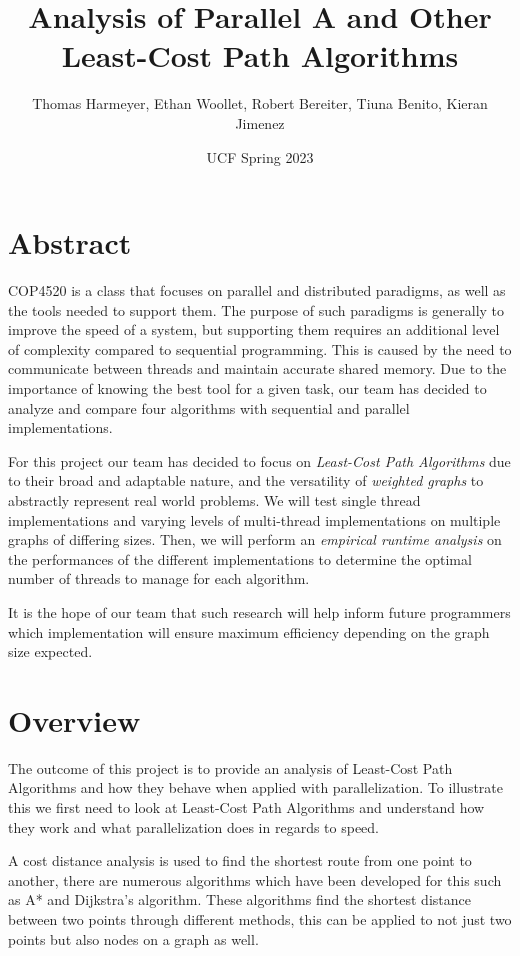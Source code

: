 \documentclass{article}
\title{Analysis of Parallel A\* and Other Least-Cost Path Algorithms}
\author{Thomas Harmeyer, Ethan Woollet, Robert Bereiter, Tiuna Benito, Kieran Jimenez}
\affil{COP4520 - Concepts of Parallel and Distributed Processing}
\date{UCF Spring 2023}
\begin{document}
\maketitle

\section{Abstract}
COP4520 is a class that focuses on parallel and distributed paradigms, as well as the tools needed to support them. The purpose of such paradigms is generally to improve the speed of a system, but supporting them requires an additional level of complexity compared to sequential programming. This is caused by the need to communicate between threads and maintain accurate shared memory. Due to the importance of knowing the best tool for a given task, our team has decided to analyze and compare four algorithms with sequential and parallel implementations.

For this project our team has decided to focus on \textit{Least-Cost Path Algorithms} due to their broad and adaptable nature, and the versatility of \textit{weighted graphs} to abstractly represent real world problems. We will test single thread implementations and varying levels of multi-thread implementations on multiple graphs of differing sizes. Then, we will perform an \textit{empirical runtime analysis} on the performances of the different implementations to determine the optimal number of threads to manage for each algorithm.

It is the hope of our team that such research will help inform future programmers which implementation will ensure maximum efficiency depending on the graph size expected.

\section{Overview}
The outcome of this project is to provide an analysis of Least-Cost Path Algorithms and how they behave when applied with parallelization. To illustrate this we first need to look at Least-Cost Path Algorithms and understand how they work and what parallelization does in regards to speed.

A cost distance analysis is used to find the shortest route from one point to another, there are numerous algorithms which have been developed for this such as A* and Dijkstra's algorithm. These algorithms find the shortest distance between two points through different methods, this can be applied to not just two points but also nodes on a graph as well.
\end{document}
